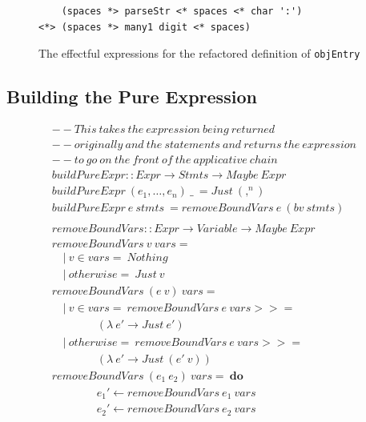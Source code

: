 \begin{figure}[t]
\begin{lstlisting}
    (spaces *> parseStr <* spaces <* char ':') 
<*> (spaces *> many1 digit <* spaces)
\end{lstlisting}
\caption{The effectful expressions for the refactored definition of \texttt{objEntry}}
\label{effectObjEntry}
\end{figure}


\subsection{Building the Pure Expression}

\vspace{5pt}
\begin{figure}
\begin{math}
\begin{aligned}
&--This\ takes\ the\ expression\ being\ returned\\
&--originally\ and\ the\ statements\ and\ returns\ the\ expression\\
&--to\ go\ on\ the\ front\ of\ the\ applicative\ chain\\
&buildPureExpr :: Expr \rightarrow Stmts \rightarrow Maybe\ Expr\\
&buildPureExpr\ (e_1,\ldots, e_n)\ \_\ = Just\ (,^n)\\
&buildPureExpr\ e\ stmts\ = removeBoundVars\ e\ (bv\ stmts)\\
\\
&removeBoundVars :: Expr \rightarrow {Variable} \rightarrow Maybe\ Expr\\
&removeBoundVars\ v\ vars =\\
&\quad |\ v \in vars =\ Nothing\\
&\quad |\ otherwise =\ Just\ v\\
&removeBoundVars\ (e\ v)\ vars =\\
&\quad |\ v \in vars =\ removeBoundVars\ e\ vars >>=\\ 
&\qquad \qquad(\lambda\ e' \rightarrow Just\ e')\\
&\quad |\ otherwise =\ removeBoundVars\ e\ vars >>=\\ 
&\qquad \qquad(\lambda\ e' \rightarrow Just\ (e'\ v))\\
&removeBoundVars\ (e_1\ e_2)\ vars =\ \textbf{do}\\
&\qquad \qquad e_1' \leftarrow removeBoundVars\ e_1\ vars\\
&\qquad \qquad e_2' \leftarrow removeBoundVars\ e_2\ vars\\

\end{aligned}
\end{math}
\end{figure}
